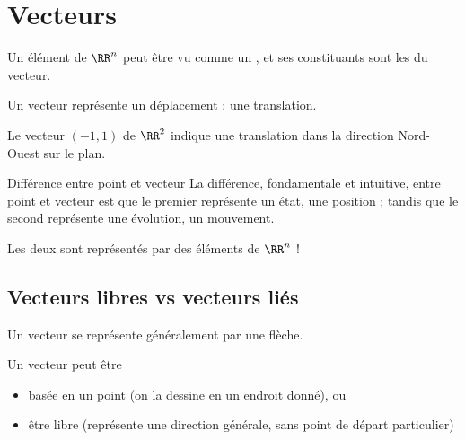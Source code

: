 \section{Vecteurs}
\begin{frame}
  \begin{definition}
    Un élément de \(\RR^{n}\) peut être vu comme un , et ses constituants sont les  du vecteur.
\end{definition}

\begin{remark}
  Un vecteur représente un déplacement : une translation.
\end{remark}

\begin{example}
 Le vecteur \((-1,1)\) de \(\RR^{2}\) indique une translation dans la direction \og Nord-Ouest\fg{} sur le plan.
\end{example}
\end{frame}


\begin{frame}
  \begin{block}{Différence entre point et vecteur}
La différence, fondamentale et intuitive, entre point et vecteur est que le premier représente un état, une position ; tandis que le second représente une évolution, un mouvement.
\end{block}

\begin{remark}
  Les deux sont représentés par des éléments de \(\RR^n\) !
\end{remark}
\end{frame}

\subsection{Vecteurs libres vs vecteurs liés}
\begin{frame}
  Un vecteur se représente généralement par une flèche.\pause

  Un vecteur peut être
  \begin{itemize}
  \item basée en un point (on la dessine en un endroit donné), ou\pause
  \item être libre (représente une direction générale, sans point de départ particulier)
\end{itemize}
\end{frame}

